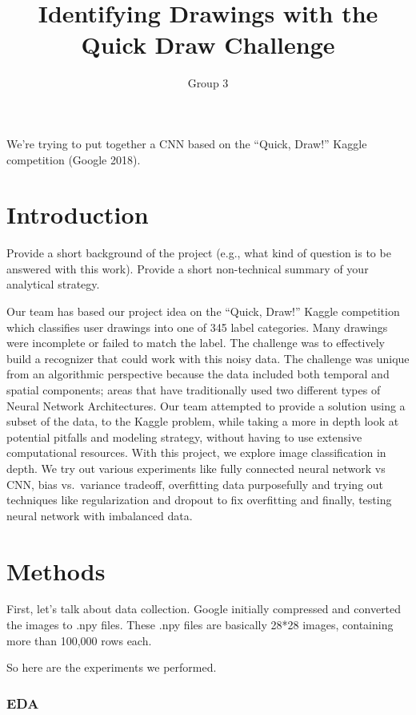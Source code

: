 \documentclass[]{article}
\title{Identifying Drawings with the Quick Draw Challenge}
\author{Group 3}
\date{}
\begin{document}
\maketitle

We're trying to put together a CNN based on the ``Quick, Draw!'' Kaggle
competition (Google 2018).

\hypertarget{introduction}{%
\section{Introduction}\label{introduction}}

Provide a short background of the project (e.g., what kind of question
is to be answered with this work). Provide a short non-technical summary
of your analytical strategy.

Our team has based our project idea on the ``Quick, Draw!'' Kaggle
competition which classifies user drawings into one of 345 label
categories. Many drawings were incomplete or failed to match the label.
The challenge was to effectively build a recognizer that could work with
this noisy data. The challenge was unique from an algorithmic
perspective because the data included both temporal and spatial
components; areas that have traditionally used two different types of
Neural Network Architectures. Our team attempted to provide a solution
using a subset of the data, to the Kaggle problem, while taking a more
in depth look at potential pitfalls and modeling strategy, without
having to use extensive computational resources. With this project, we
explore image classification in depth. We try out various experiments
like fully connected neural network vs CNN, bias vs.~variance tradeoff,
overfitting data purposefully and trying out techniques like
regularization and dropout to fix overfitting and finally, testing
neural network with imbalanced data.

\hypertarget{methods}{%
\section{Methods}\label{methods}}

First, let's talk about data collection. Google initially compressed and
converted the images to .npy files. These .npy files are basically 28*28
images, containing more than 100,000 rows each.

So here are the experiments we performed.

\hypertarget{eda}{%
\subsubsection{EDA}\label{eda}}
\end{document}
